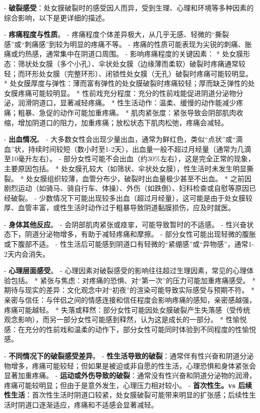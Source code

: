 \begin{enumerate}
- \textbf{破裂感受}：处女膜破裂时的感受因人而异，受到生理、心理和环境等多种因素的综合影响，以下是更详细的描述。

  - \textbf{疼痛程度与性质}。
    - 疼痛程度个体差异极大，从几乎无感、轻微的“撕裂感”或“刺痛感”到较为明显的疼痛不等。
    - 疼痛的性质可能表现为尖锐的刺痛、胀痛或灼热感，通常集中在阴道口周围。
    - 影响疼痛程度的关键因素：
      * 处女膜形态：筛状处女膜（多个小孔）、伞状处女膜（边缘薄而柔软）破裂时疼痛通常较轻；而环形处女膜（完整环形）、闭锁性处女膜（无孔）破裂时疼痛可能较明显。
      * 处女膜厚度与弹性：薄而富有弹性的处女膜破裂时疼痛较轻；厚而缺乏弹性的处女膜疼痛可能较明显。
      * 性前戏充分程度：充分的性前戏能促进阴道分泌物分泌，润滑阴道口，显著减轻疼痛。
      * 性生活动作：温柔、缓慢的动作能减少疼痛；粗暴、急促的动作可能加重疼痛。
      * 肌肉紧张度：紧张导致会阴部肌肉收缩，增加阴道口的阻力，加重疼痛；放松状态下肌肉松弛，疼痛会减轻。

  - \textbf{出血情况}。
    - 大多数女性会出现少量出血，通常为鲜红色，类似“点状”或“滴血”状，持续时间较短（数小时至1-2天），出血量一般不超过月经量（通常为几滴至10毫升左右）。
    - 部分女性可能不会出血（约30\%左右），这是完全正常的现象，主要原因包括。
      * 处女膜孔较大（如筛状、伞状处女膜），性生活时未发生明显撕裂。
      * 处女膜组织较薄，血管分布少，破裂时出血量极少甚至不出血。
      * 之前因剧烈运动（如骑马、骑自行车、体操）、外伤（如跌倒）、妇科检查或自慰等原因已经破裂。
    - 少数情况下可能出现较多出血（超过月经量），这可能是由于处女膜较厚、血管丰富，或性生活时动作过于粗暴导致阴道黏膜损伤，应及时就医。

  - \textbf{身体其他反应}。
    - 会阴部肌肉紧张或痉挛，可能导致暂时的不适感。
    - 性兴奋状态下，阴道分泌物增多，有助于减轻疼痛和摩擦。
    - 部分女性可能出现轻微的腹胀或下腹部不适。
    - 性生活后可能感到阴道口有轻微的“紧绷感”或“异物感”，通常1-2天内会消失。

  - \textbf{心理层面感受}。
    - 心理因素对破裂感受的影响往往超过生理因素，常见的心理体验包括。
      * 紧张与焦虑：对疼痛的恐惧、对“第一次”的压力可能加重疼痛感受。
      * 期待与现实的差异：文化观念中对“初夜”的渲染可能导致实际感受与预期不符。
      * 亲密与信任：与伴侣之间的情感连接和信任程度会影响疼痛的感知，亲密感越强，疼痛可能越轻。
      * 失落或释然：部分女性可能因处女膜破裂产生失落感（受传统观念影响），而另一部分女性可能感到释然，认为这是成长的一部分。
      * 性愉悦感：在充分的性前戏和温柔的动作下，部分女性可能同时体验到不同程度的性愉悦感。

  - \textbf{不同情况下的破裂感受差异}。
    - \textbf{性生活导致的破裂}：通常伴有性兴奋和阴道分泌物增多，疼痛可能较轻；但如果是被迫或非自愿的性生活，心理恐惧和身体紧张会显著加重疼痛。
    - \textbf{运动或外伤导致的破裂}：通常没有性兴奋和阴道分泌物的润滑，疼痛可能较明显；但由于是意外发生，心理压力相对较小。
    - \textbf{首次性生。vs 后续性生活}：首次性生活时阴道口较紧，处女膜破裂可能带来明显的扩张感；后续性生活时阴道口逐渐适应，疼痛和不适感会显著减轻。


\end{enumerate}
